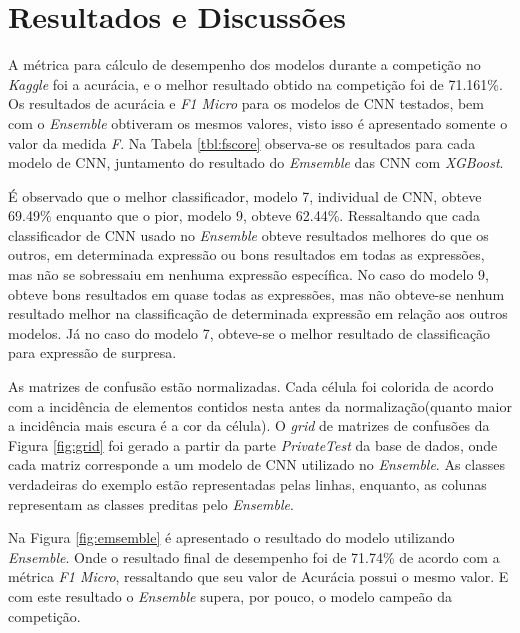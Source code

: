 \section{Resultados e Discussões}
A métrica para cálculo de desempenho dos modelos durante a competição no \emph{Kaggle} foi a acurácia, e o melhor resultado obtido na competição foi de 71.161\%. Os resultados de acurácia e \emph{F1 Micro} para os modelos de CNN testados, bem com o \emph{Ensemble} obtiveram os mesmos valores, visto isso é apresentado somente o valor da medida \emph{F}. Na Tabela \ref{tbl:fscore} observa-se os resultados para cada modelo de CNN, juntamento do resultado do \emph{Emsemble} das CNN com \emph{XGBoost}.

É observado que o melhor classificador, modelo 7, individual de CNN, obteve 69.49\% enquanto que o pior, modelo 9, obteve 62.44\%. Ressaltando que cada classificador de CNN usado no \emph{Ensemble} obteve resultados melhores do que os outros, em determinada expressão ou bons resultados em todas as expressões, mas não se sobressaiu em nenhuma expressão específica. No caso do modelo 9, obteve bons resultados em quase todas as expressões, mas não obteve-se nenhum resultado melhor na classificação de determinada expressão em relação aos outros modelos. Já no caso do modelo 7, obteve-se o melhor resultado de classificação para expressão de surpresa. 



As matrizes de confusão estão normalizadas. Cada célula foi colorida de acordo com a incidência de elementos contidos nesta antes da normalização(quanto maior a incidência mais escura é a cor da célula). O \emph{grid} de matrizes de confusões da Figura \ref{fig:grid} foi gerado a partir da parte \emph{PrivateTest} da base de dados, onde cada matriz corresponde a um modelo de CNN utilizado no \emph{Ensemble}. As classes verdadeiras do exemplo estão representadas pelas linhas, enquanto, as colunas representam as classes preditas pelo \emph{Ensemble}.

Na Figura \ref{fig:emsemble} é apresentado o resultado do modelo utilizando \emph{Ensemble}. Onde o resultado final de desempenho foi de 71.74\% de acordo com a métrica \emph{F1 Micro}, ressaltando que seu valor de Acurácia possui o mesmo valor. E com este resultado o \emph{Ensemble} supera, por pouco, o modelo campeão da competição.

